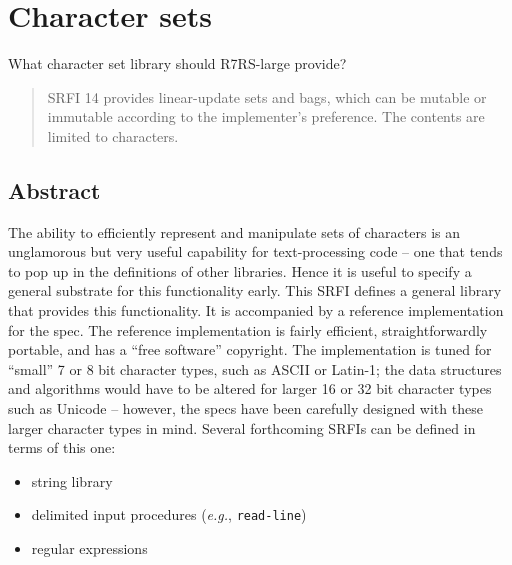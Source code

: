 \section{Character sets}
 What character set library should R7RS-large provide?

\begin{quote}
SRFI 14 provides linear-update sets and bags, which can be mutable or
immutable according to the implementer's preference. The contents are
limited to characters.
\end{quote}

\subsection{{Abstract}}\label{abstract}

The ability to efficiently represent and manipulate sets of characters
is an unglamorous but very useful capability for text-processing code --
one that tends to pop up in the definitions of other libraries. Hence it
is useful to specify a general substrate for this functionality early.
This SRFI defines a general library that provides this functionality. It
is accompanied by a reference implementation for the spec. The reference
implementation is fairly efficient, straightforwardly portable, and has
a ``free software'' copyright. The implementation is tuned for ``small''
7 or 8 bit character types, such as ASCII or Latin-1; the data
structures and algorithms would have to be altered for larger 16 or 32
bit character types such as Unicode -- however, the specs have been
carefully designed with these larger character types in mind. Several
forthcoming SRFIs can be defined in terms of this one:

\begin{itemize}
\tightlist
\item
  string library
\item
  delimited input procedures (\emph{e.g.}, \texttt{read-line})
\item
  regular expressions
\end{itemize}



